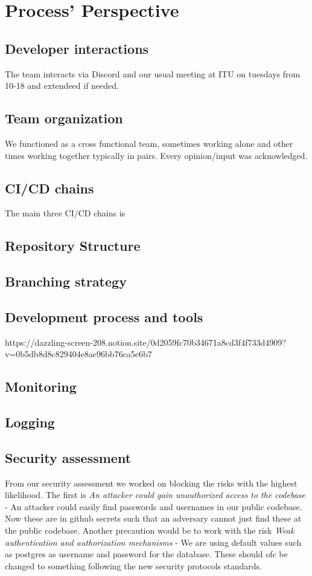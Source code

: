 \section{Process' Perspective}

\subsection{Developer interactions}
The team interacts via Discord and our usual meeting at ITU on tuesdays from 10-18 and extendeed if needed.

\subsection{Team organization}
We functioned as a cross functional team, sometimes working alone and other times working together typically in pairs. Every opinion/input was acknowledged. 

\subsection{CI/CD chains}
The main three CI/CD chains is

\subsection{Repository Structure}

\subsection{Branching strategy}

\subsection{Development process and tools}
https://dazzling-screen-208.notion.site/0d2059fc70b34671a8cd3f4f733d4909?v=0b5db8d8c829404e8ae96bb76ca5e6b7

\subsection{Monitoring}

\subsection{Logging}

\subsection{Security assessment}
From our security assessment we worked on blocking the risks with the highest likelihood. The first is \textit{An attacker could gain unauthorized access to the codebase}
- An attacker could easily find passwords and usernames in our public codebase. Now these are in github secrets such that an adversary cannot just 
find these at the public codebase. Another precaution would be to work with the risk \textit{Weak authentication and authorization mechanisms}
 - We are using default values such as postgres as username and password for the database. These should ofc be changed to something following the
 new security protocols standards. 

